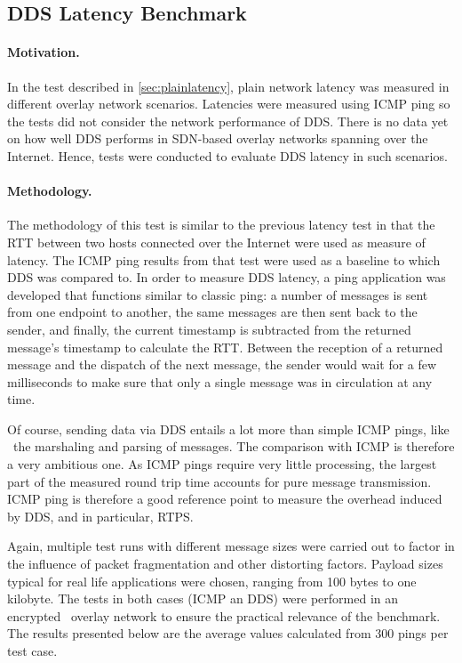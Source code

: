 %
%
%
%
%
%
%
%
%
%

\subsection{DDS Latency Benchmark} \label{sec:ddslatency}

\paragraph{Motivation.} In the test described in \autoref{sec:plainlatency}, plain network latency was measured in different overlay network scenarios. Latencies were measured using ICMP ping so the tests did not consider the network performance of DDS. There is no data yet on how well DDS performs in SDN-based overlay networks spanning over the Internet. Hence, tests were conducted to evaluate DDS latency in such scenarios.

\paragraph{Methodology.} The methodology of this test is similar to the previous latency test in that the RTT between two hosts connected over the Internet were used as measure of latency. The ICMP ping results from that test were used as a baseline to which DDS was compared to. In order to measure DDS latency, a ping application was developed that functions similar to classic ping: a number of messages is sent from one endpoint to another, the same messages are then sent back to the sender, and finally, the current timestamp is subtracted from the returned message's timestamp to calculate the RTT. Between the reception of a returned message and the dispatch of the next message, the sender would wait for a few milliseconds to make sure that only a single message was in circulation at any time.

Of course, sending data via DDS entails a lot more than simple ICMP pings, like \eg\ the marshaling and parsing of messages. The comparison with ICMP is therefore a very ambitious one. As ICMP pings require very little processing, the largest part of the measured round trip time accounts for pure message transmission. ICMP ping is therefore a good reference point to measure the overhead induced by DDS, and in particular, RTPS. 

Again, multiple test runs with different message sizes were carried out to factor in the influence of packet fragmentation and other distorting factors. Payload sizes typical for real life applications were chosen, ranging from 100 bytes to one kilobyte. The tests in both cases (ICMP an DDS) were performed in an encrypted \wnet\ overlay network to ensure the practical relevance of the benchmark. The results presented below are the average values calculated from 300 pings per test case.


